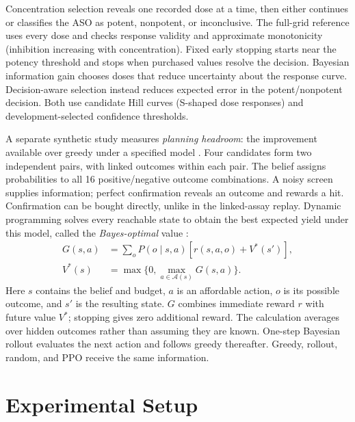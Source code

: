 \documentclass[letterpaper]{article}
\begin{document}
Concentration selection reveals one recorded dose at a time, then either continues or classifies the ASO as potent, nonpotent, or inconclusive. The full-grid reference uses every dose and checks response validity and approximate monotonicity (inhibition increasing with concentration). Fixed early stopping starts near the potency threshold and stops when purchased values resolve the decision. Bayesian information gain chooses doses that reduce uncertainty about the response curve. Decision-aware selection instead reduces expected error in the potent/nonpotent decision. Both use candidate Hill curves (S-shaped dose responses) and development-selected confidence thresholds.

A separate synthetic study measures \emph{planning headroom}: the improvement available over greedy under a specified model \citep{jiang,nguyen}. Four candidates form two independent pairs, with linked outcomes within each pair. The belief assigns probabilities to all 16 positive/negative outcome combinations. A noisy screen supplies information; perfect confirmation reveals an outcome and rewards a hit. Confirmation can be bought directly, unlike in the linked-assay replay. Dynamic programming solves every reachable state to obtain the best expected yield under this model, called the \emph{Bayes-optimal} value \citep{sutton}:
\begin{equation}
 \begin{aligned}
 G(s,a)&=\sum_o P(o\mid s,a)[r(s,a,o)+V^*(s')],\\
 V^*(s)&=\max\{0,\max_{a\in\mathcal A(s)}G(s,a)\}.
 \end{aligned}
 \label{eq:dp}
\end{equation}
Here $s$ contains the belief and budget, $a$ is an affordable action, $o$ is its possible outcome, and $s'$ is the resulting state. $G$ combines immediate reward $r$ with future value $V^*$; stopping gives zero additional reward. The calculation averages over hidden outcomes rather than assuming they are known. One-step Bayesian rollout evaluates the next action and follows greedy thereafter. Greedy, rollout, random, and PPO receive the same information.

\section{Experimental Setup}
\end{document}
